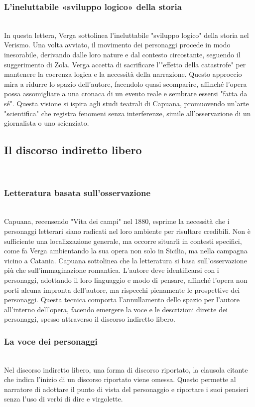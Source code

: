 \documentclass{report}
\begin{document}
\subsubsection{L’ineluttabile  «sviluppo  logico»  della  storia}
\\
In questa lettera, Verga sottolinea l'ineluttabile "sviluppo logico" della storia nel Verismo. Una volta avviato, il movimento dei personaggi procede in modo inesorabile, derivando dalle loro nature e dal contesto circostante, seguendo il suggerimento di Zola. Verga accetta di sacrificare l'"effetto della catastrofe" per mantenere la coerenza logica e la necessità della narrazione. Questo approccio mira a ridurre lo spazio dell'autore, facendolo quasi scomparire, affinché l'opera possa assomigliare a una cronaca di un evento reale e sembrare essersi "fatta da sé". Questa visione si ispira agli studi teatrali di Capuana, promuovendo un'arte "scientifica" che registra fenomeni senza interferenze, simile all'osservazione di un giornalista o uno scienziato.
\\
\subsection{Il discorso indiretto libero}
\\
\subsubsection{Letteratura basata sull’osservazione}
\\
Capuana, recensendo "Vita dei campi" nel 1880, esprime la necessità che i personaggi letterari siano radicati nel loro ambiente per risultare credibili. Non è sufficiente una localizzazione generale, ma occorre situarli in contesti specifici, come fa Verga ambientando la sua opera non solo in Sicilia, ma nella campagna vicino a Catania. Capuana sottolinea che la letteratura si basa sull'osservazione più che sull'immaginazione romantica. L'autore deve identificarsi con i personaggi, adottando il loro linguaggio e modo di pensare, affinché l'opera non porti alcuna impronta dell'autore, ma rispecchi pienamente le prospettive dei personaggi. Questa tecnica comporta l'annullamento dello spazio per l'autore all'interno dell'opera, facendo emergere la voce e le descrizioni dirette dei personaggi, spesso attraverso il discorso indiretto libero.
\\
\subsubsection{La voce dei personaggi}
\\
Nel discorso indiretto libero, una forma di discorso riportato, la clausola citante che indica l'inizio di un discorso riportato viene omessa. Questo permette al narratore di adottare il punto di vista del personaggio e riportare i suoi pensieri senza l'uso di verbi di dire e virgolette.
\\
\end{document}
